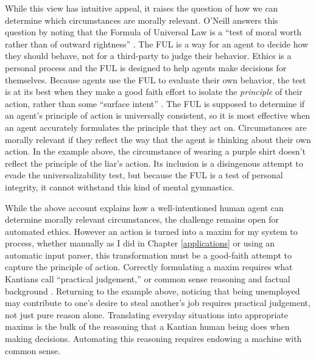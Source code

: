 \begin{isabellebody}
\begin{isamarkuptext}
While this view has intuitive appeal, it raises the question of how we can determine
which circumstances are morally relevant. O'Neill answers this question by noting that the Formula of Universal Law is 
a ``test of moral worth rather than of outward rightness'' \citep[98]{constofreason}. The FUL is a way 
for an agent to decide how they should behave, not for a third-party to judge their behavior. Ethics is 
a personal process and the FUL is designed to help agents make decisions for themselves. Because agents use 
the FUL to evaluate their own behavior, the test is at its 
best when they make a good faith effort to isolate the \emph{principle} of their action, rather than some
``surface intent'' \citep[87]{constofreason}. The FUL is supposed to determine if an agent's principle of action
is universally consistent, so it is most effective when an agent accurately formulates the principle that
they act on. Circumstances are morally relevant if they reflect the way that the agent is 
thinking about their own action. In the example above, the circumstance of wearing a purple shirt doesn't reflect
the principle of the liar's action. Its inclusion is a disingenous attempt to evade the universalizability
test, but because the FUL is a test of personal integrity, it cannot withstand this kind of mental
gymnastics. 
 
While the above account explains how a well-intentioned human agent can determine 
morally relevant circumstances, the challenge remains open for automated ethics. However an action is turned into a maxim for my system 
to process, whether manually as I did in Chapter \ref{applications} or using an automatic input 
parser, this transformation must be a good-faith attempt to capture the principle of action. 
Correctly formulating a maxim requires what Kantians call ``practical judgement,'' or
common sense reasoning and factual background \citep{oneilluniversallaws}. Returning to the example above, noticing that being 
unemployed may contribute to one's desire to steal another's job requires practical
judgement, not just pure reason alone. Translating everyday situations into appropriate maxims is
the bulk of the reasoning that a Kantian human being does when making decisions. Automating this
reasoning requires endowing a machine with common sense. 


\end{isamarkuptext}
\end{isabellebody}
